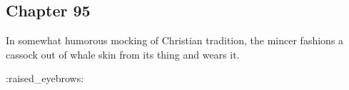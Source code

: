 \subsection{Chapter 95}

In somewhat humorous mocking of Christian tradition, the mincer fashions a
cassock out of whale skin from its thing and wears it.

:raised\_eyebrows:
